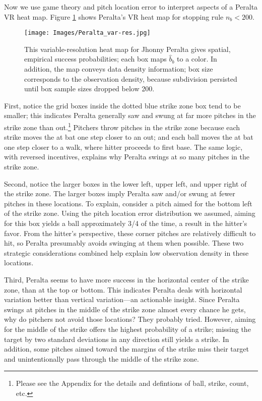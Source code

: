 Now we use game theory and pitch location error to interpret aspects of a Peralta VR heat map. Figure \ref{fig:interp} shows Peralta's VR heat map for stopping rule $n_{b} < 200$.
        \begin{figure}[H]
      	\centering      
      	\texttt{[image: Images/Peralta\_var-res.jpg]}
      	\caption{This variable-resolution heat map for Jhonny Peralta gives spatial, empirical success probabilities; each box maps $\hat{b}_{b}$ to a color. In addition, the map conveys data density information; box size corresponds to the observation density, because subdivision persisted until box sample sizes dropped below 200.}
      	\label{fig:interp}
        \end{figure}
First, notice the grid boxes inside the dotted blue strike zone box tend to be smaller; this indicates Peralta generally saw and swung at far more pitches in the strike zone than out.\footnote{Please see the Appendix for the details and defintions of ball, strike, count, etc.} Pitchers throw pitches in the strike zone because each strike moves the at bat one step closer to an out; and each ball moves the at bat one step closer to a walk, where hitter proceeds to first base. The same logic, with reversed incentives, explains why Peralta swings at so many pitches in the strike zone. 

Second, notice the larger boxes in the lower left, upper left, and upper right of the strike zone. The larger boxes imply Peralta saw and/or swung at fewer pitches in these locations. To explain, consider a pitch aimed for the bottom left of the strike zone. Using the pitch location error distribution we assumed, aiming for this box yields a ball approximately 3/4 of the time, a result in the hitter's favor. From the hitter's perspective, these corner pitches are relatively difficult to hit, so Peralta presumably avoids swinging at them when possible. These two strategic considerations combined help explain low observation density in these locations.

Third, Peralta seems to have more success in the horizontal center of the strike zone, than at the top or bottom. This indicates Peralta deals with horizontal variation better than vertical variation---an actionable insight. Since Peralta swings at pitches in the middle of the strike zone almost every chance he gets, why do pitchers not avoid those locations? They probably tried. However, aiming for the middle of the strike offers the highest probability of a strike; missing the target by two standard deviations in any direction still yields a strike. In addition, some pitches aimed toward the margins of the strike miss their target and unintentionally pass through the middle of the strike zone. 

